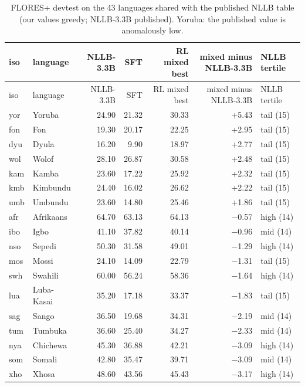 {\scriptsize
\setlength{\tabcolsep}{4pt}
\begin{longtable}{@{}llrrrrl@{}}
\caption{FLORES+ devtest \chrfpp{} on the 43 languages shared with the published NLLB table (our values greedy; NLLB-3.3B published). Yoruba: the published value is anomalously low.}\label{tab:perlang_nllb}\\
\toprule
iso & language & NLLB-3.3B & SFT & RL mixed best & mixed minus NLLB-3.3B & NLLB tertile \\
\midrule\endfirsthead
\toprule
iso & language & NLLB-3.3B & SFT & RL mixed best & mixed minus NLLB-3.3B & NLLB tertile \\
\midrule\endhead
\bottomrule\endlastfoot
yor & Yoruba & 24.90 & 21.32 & 30.33 & +5.43 & tail (15) \\
fon & Fon & 19.30 & 20.17 & 22.25 & +2.95 & tail (15) \\
dyu & Dyula & 16.20 & 9.90 & 18.97 & +2.77 & tail (15) \\
wol & Wolof & 28.10 & 26.87 & 30.58 & +2.48 & tail (15) \\
kam & Kamba & 23.60 & 17.22 & 25.92 & +2.32 & tail (15) \\
kmb & Kimbundu & 24.40 & 16.02 & 26.62 & +2.22 & tail (15) \\
umb & Umbundu & 23.60 & 14.80 & 25.46 & +1.86 & tail (15) \\
afr & Afrikaans & 64.70 & 63.13 & 64.13 & \ensuremath{-}0.57 & high (14) \\
ibo & Igbo & 41.10 & 37.82 & 40.14 & \ensuremath{-}0.96 & mid (14) \\
nso & Sepedi & 50.30 & 31.58 & 49.01 & \ensuremath{-}1.29 & high (14) \\
mos & Mossi & 24.10 & 14.09 & 22.79 & \ensuremath{-}1.31 & tail (15) \\
swh & Swahili & 60.00 & 56.24 & 58.36 & \ensuremath{-}1.64 & high (14) \\
lua & Luba-Kasai & 35.20 & 17.18 & 33.37 & \ensuremath{-}1.83 & tail (15) \\
sag & Sango & 36.50 & 19.68 & 34.31 & \ensuremath{-}2.19 & mid (14) \\
tum & Tumbuka & 36.60 & 25.40 & 34.27 & \ensuremath{-}2.33 & mid (14) \\
nya & Chichewa & 45.30 & 36.88 & 42.21 & \ensuremath{-}3.09 & high (14) \\
som & Somali & 42.80 & 35.47 & 39.71 & \ensuremath{-}3.09 & mid (14) \\
xho & Xhosa & 48.60 & 43.56 & 45.43 & \ensuremath{-}3.17 & high (14) \\

\end{longtable}}
